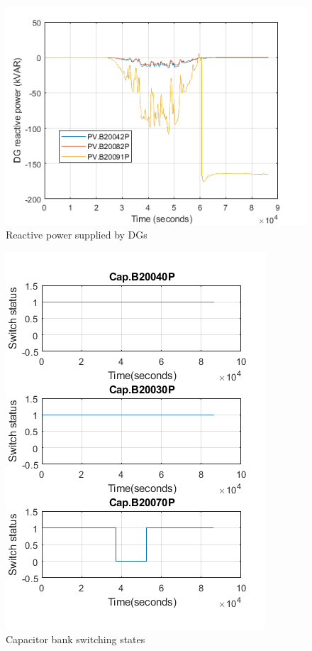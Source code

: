 \begin{figure}[!h]
\centering
\includegraphics[width=\linewidth]{figs/CVC/DG_Q.png}
\caption{Reactive power supplied by DGs}
\label{fig:DG_Q}
\end{figure}

\begin{figure}[!h]
\centering
\includegraphics[width=0.8\linewidth]{figs/CVC/CAP_BANK.png}
\caption{Capacitor bank switching states}
\label{fig:cap_bank}
\end{figure}
